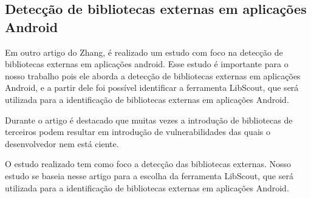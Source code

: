 \subsection{Detecção de bibliotecas externas em aplicações Android} %

Em outro artigo do Zhang, é realizado um estudo com foco na detecção de bibliotecas externas em aplicações android. \cite{api_tpl_zhang} Esse estudo é importante para o nosso trabalho pois ele aborda a detecção de bibliotecas externas em aplicações Android, e a partir dele foi possível identificar a ferramenta LibScout, que será utilizada para a identificação de bibliotecas externas em aplicações Android.

Durante o artigo é destacado que muitas vezes a introdução de bibliotecas de terceiros podem resultar em introdução de vulnerabilidades das quais o desenvolvedor nem está ciente. 

O estudo realizado tem como foco a detecção das bibliotecas externas. Nosso estudo se baseia nesse artigo para a escolha da ferramenta LibScout, que será utilizada para a identificação de bibliotecas externas em aplicações Android.




